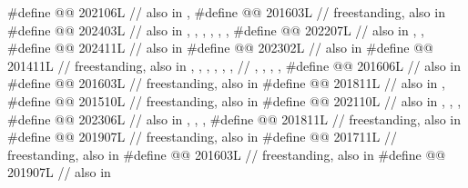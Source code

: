 \begin{codeblock}
#define @@ 202106L // also in , 
#define @@               201603L // freestanding, also in 
#define @@      202403L
  // also in , , , , , , 
#define @@   202207L
  // also in , , 
#define @@                  202411L // also in 
#define @@                 202302L // also in 
#define @@  201411L
  // freestanding, also in , , , , , ,
  // , , , , 
#define @@                               201606L // also in 
#define @@                             201603L // freestanding, also in 
#define @@                   201811L // also in , 
#define @@                          201510L // freestanding, also in 
#define @@ 202110L
  // also in , , , 
#define @@ 202306L
  // also in , , , 
#define @@                    201811L // freestanding, also in 
#define @@                  201907L // freestanding, also in 
#define @@                      201711L // freestanding, also in 
#define @@        201603L // freestanding, also in 
#define @@     201907L // also in 

\end{codeblock}
